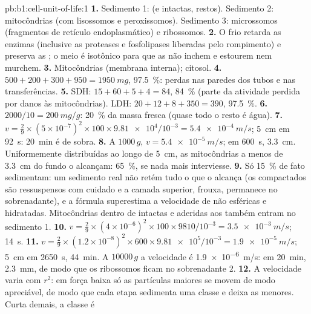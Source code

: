 \begin{solution}{pb:b1:cell-unit-of-life:1}
\textbf{1.} Sedimento 1:  (e  intactas, restos). Sedimento
2: mitocôndrias (com lisossomos e peroxissomos). Sedimento 3:
microssomos (fragmentos de retículo endoplasmático) e ribossomos.
\textbf{2.} O frio retarda as enzimas (inclusive as proteases e
fosfolipases liberadas pelo rompimento) e preserva as ; o meio
é isotônico para que as  não inchem e estourem nem murchem.
\textbf{3.} Mitocôndrias (membrana interna); citosol.
\textbf{4.} $500 + 200 + 300 + 950 = \qty{1950}{mg}$, \qty{97.5}{\%}:
perdas nas paredes dos tubos e nas transferências.
\textbf{5.} SDH: $15 + 60 + 5 + 4 = 84$, \qty{84}{\%} (parte da
atividade perdida por danos às mitocôndrias). LDH:
$20 + 12 + 8 + 350 = 390$, \qty{97.5}{\%}.
\textbf{6.} $2000/10 = \qty{200}{mg/g}$: \qty{20}{\%} da massa fresca (quase todo o resto é água).
\textbf{7.} $v = \frac{2}{9}\times(5\times 10^{-7})^2\times 100\times
\num{9.81e4}/10^{-3} = \qty{5.4e-4}{m/s}$; \qty{5}{cm} em \qty{92}{s}:
\qty{20}{min} é de sobra.
\textbf{8.} A $1000\,g$, $v = \qty{5.4e-5}{m/s}$; em \qty{600}{s},
\qty{3.3}{cm}. Uniformemente distribuídas ao longo de \qty{5}{cm}, as
mitocôndrias a menos de \qty{3.3}{cm} do fundo o alcançam:
\qty{65}{\%}, se nada mais interviesse.
\textbf{9.} Só \qty{15}{\%} de fato sedimentam: um sedimento real não
retém tudo o que o alcança (os  compactados são ressuspensos com
cuidado e a camada superior, frouxa, permanece no sobrenadante), e a
fórmula superestima a velocidade de  não esféricas e
hidratadas. Mitocôndrias dentro de  intactas e aderidas aos
 também entram no sedimento 1.
\textbf{10.} $v = \frac{2}{9}\times(4\times 10^{-6})^2\times 100\times
9810/10^{-3} = \qty{3.5e-3}{m/s}$; \qty{14}{s}.
\textbf{11.} $v = \frac{2}{9}\times(1.2\times 10^{-8})^2\times 600\times
\num{9.81e5}/10^{-3} = \qty{1.9e-5}{m/s}$; \qty{5}{cm} em \qty{2650}{s},
\qty{44}{min}. A $\num{10000}\,g$ a velocidade é \qty{1.9e-6}{m/s}: em
\qty{20}{min}, \qty{2.3}{mm}, de modo que os ribossomos ficam no
sobrenadante 2.
\textbf{12.} A velocidade varia com $r^2$: em força baixa só as
partículas maiores se movem de modo apreciável, de modo que cada etapa
sedimenta uma classe e deixa as menores. Curta demais, a classe é

\end{solution}
